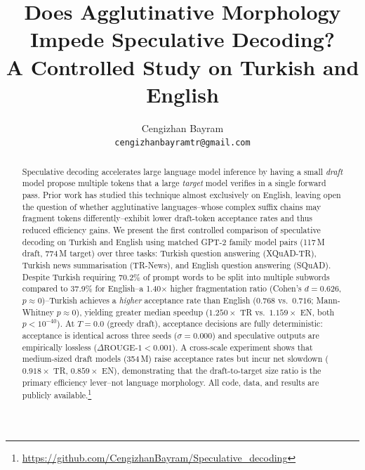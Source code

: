 \documentclass[11pt,a4paper]{article}
\title{Does Agglutinative Morphology Impede Speculative Decoding?\\
       A Controlled Study on Turkish and English}
\author{
  Cengizhan Bayram \\
  \texttt{cengizhanbayramtr@gmail.com}
}
\newcommand{\pct}[1]{#1\%}
\begin{document}
\maketitle
\begin{abstract}
Speculative decoding accelerates large language model inference by having
a small \emph{draft} model propose multiple tokens that a large \emph{target}
model verifies in a single forward pass.
Prior work has studied this technique almost exclusively on English, leaving
open the question of whether agglutinative languages--whose complex suffix
chains may fragment tokens differently--exhibit lower draft-token acceptance
rates and thus reduced efficiency gains.
We present the first controlled comparison of speculative decoding on Turkish
and English using matched GPT-2 family model pairs (117\,M draft, 774\,M
target) over three tasks: Turkish question answering (XQuAD-TR), Turkish
news summarisation (TR-News), and English question answering (SQuAD).
Despite Turkish requiring \pct{70.2} of prompt words to be split into
multiple subwords compared to \pct{37.9} for English--a 1.40$\times$
higher fragmentation ratio (Cohen's $d=0.626$, $p\!\approx\!0$)--Turkish
achieves a \emph{higher} acceptance rate than English
($0.768$ vs.\ $0.716$; Mann-Whitney $p\!\approx\!0$), yielding
greater median speedup ($1.250\!\times$ TR vs.\ $1.159\!\times$ EN,
both $p < 10^{-40}$).
At $T=0.0$ (greedy draft), acceptance decisions are fully deterministic:
acceptance is identical across three seeds ($\sigma = 0.000$) and
speculative outputs are empirically lossless
($\Delta\mathrm{ROUGE\text{-}1} < 0.001$).
A cross-scale experiment shows that medium-sized draft models (354\,M)
raise acceptance rates but incur net slowdown ($0.918\!\times$ TR,
$0.859\!\times$ EN), demonstrating that the draft-to-target size ratio
is the primary efficiency lever--not language morphology.
All code, data, and results are publicly available.\footnote{\url{https://github.com/CengizhanBayram/Speculative_decoding}}
\end{abstract}
\end{document}
